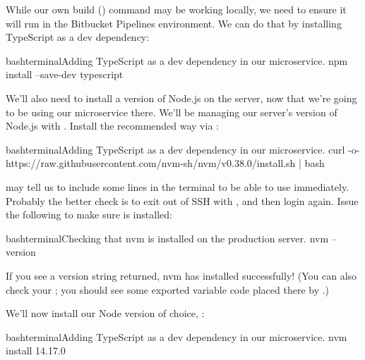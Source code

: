 \documentclass[a4paper,headinclude=on,footinclude=on,12pt,oneside]{scrbook}
\begin{document}

While our own build () command may be working locally, we need to ensure it will run in the Bitbucket Pipelines environment. We can do that by installing TypeScript as a dev dependency:

\begin{codeInput}{bash}{terminal}{Adding TypeScript as a dev dependency in our microservice.}
npm install --save-dev typescript
\end{codeInput}


We'll also need to install a version of Node.js on the server, now that we're going to be using our microservice there. We'll be managing our server's version of Node.js with . Install  the recommended way via :

\begin{codeInput}{bash}{terminal}{Adding TypeScript as a dev dependency in our microservice.}
curl -o- https://raw.githubusercontent.com/nvm-sh/nvm/v0.38.0/install.sh | bash
\end{codeInput}

 may tell us to include some lines in the terminal to be able to use  immediately. Probably the better check is to exit out of SSH with , and then login again. Issue the following to make sure  is installed:

\begin{codeInput}{bash}{terminal}{Checking that nvm is installed on the production server.}
nvm --version
\end{codeInput}

If you see a version string returned, nvm has installed successfully! (You can also check your ; you should see some exported variable code placed there by .) 


We'll now install our Node version of choice, :

\begin{codeInput}{bash}{terminal}{Adding TypeScript as a dev dependency in our microservice.}
nvm install 14.17.0
\end{codeInput}

\end{document}
